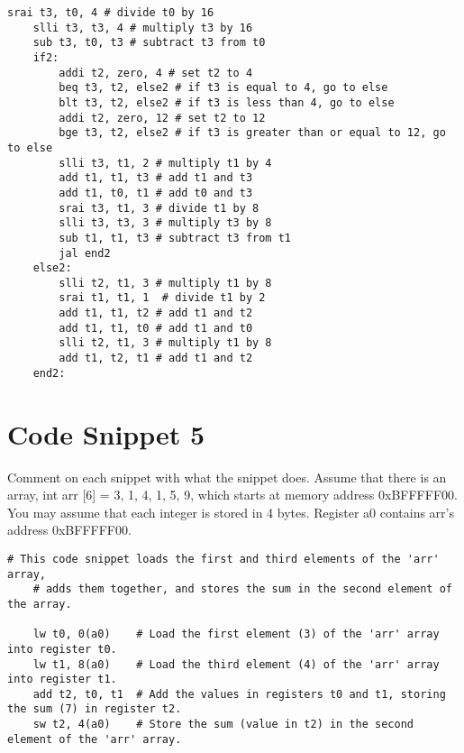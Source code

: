 \documentclass[12pt]{article}
\begin{document}
    \begin{lstlisting}[language=RISCV]
        srai t3, t0, 4 # divide t0 by 16
    slli t3, t3, 4 # multiply t3 by 16
    sub t3, t0, t3 # subtract t3 from t0
    if2:
        addi t2, zero, 4 # set t2 to 4
        beq t3, t2, else2 # if t3 is equal to 4, go to else
        blt t3, t2, else2 # if t3 is less than 4, go to else
        addi t2, zero, 12 # set t2 to 12
        bge t3, t2, else2 # if t3 is greater than or equal to 12, go to else
        slli t3, t1, 2 # multiply t1 by 4
        add t1, t1, t3 # add t1 and t3
        add t1, t0, t1 # add t0 and t3
        srai t3, t1, 3 # divide t1 by 8
        slli t3, t3, 3 # multiply t3 by 8
        sub t1, t1, t3 # subtract t3 from t1
        jal end2
    else2:
        slli t2, t1, 3 # multiply t1 by 8
        srai t1, t1, 1  # divide t1 by 2
        add t1, t1, t2 # add t1 and t2
        add t1, t1, t0 # add t1 and t0
        slli t2, t1, 3 # multiply t1 by 8
        add t1, t2, t1 # add t1 and t2
    end2:
    \end{lstlisting}

    \newpage
    \section{Code Snippet 5}
        \begin{flushleft}
        Comment on each snippet with what the snippet does. Assume that there is an
        array, int arr [6] = {3, 1, 4, 1, 5, 9}, which starts at memory address
        0xBFFFFF00. You may assume that each integer is stored in 4 bytes. Register a0 contains
        arr's address 0xBFFFFF00.
    \end{flushleft}
    \begin{lstlisting}[language=RISCV]
# This code snippet loads the first and third elements of the 'arr' array, 
    # adds them together, and stores the sum in the second element of the array.
        
    lw t0, 0(a0)    # Load the first element (3) of the 'arr' array into register t0.
    lw t1, 8(a0)    # Load the third element (4) of the 'arr' array into register t1.
    add t2, t0, t1  # Add the values in registers t0 and t1, storing the sum (7) in register t2.
    sw t2, 4(a0)    # Store the sum (value in t2) in the second element of the 'arr' array.

    \end{lstlisting}
\end{document}
